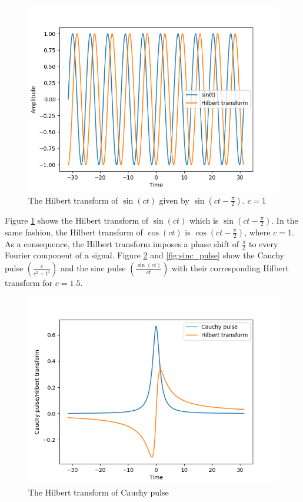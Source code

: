 \documentclass[../Main/thesis.tex]{subfiles}
\begin{document}
\begin{figure}[H]
	\centering
	\includegraphics[width=0.8\linewidth]{../fig/h_sin}
	\caption{The Hilbert transform of $\sin(ct)$ given by $\sin(ct-\frac{\pi}{2})$. $c=1$  }
	\label{fig:hsin}
\end{figure}
\justify
Figure \ref{fig:hsin} shows the Hilbert transform of $\sin(ct)$ which is $\sin\left(ct-\frac{\pi}{2}\right)$. In the same fashion, the Hilbert transform of $\cos(ct)$ is  $\cos\left(ct-\frac{\pi}{2}\right)$, where $c = 1$. As a consequence, the Hilbert transform imposes a phase shift of $\frac{\pi}{2}$ to every Fourier component of a signal. Figure \ref{fig:cauchy_pulse} and \ref{fig:sinc_pulse} show the Cauchy pulse $\left(\frac{c}{c^{2} + t^{2}}\right)$ and the sinc pulse $\left(\frac{\sin(ct)}{ct}\right)$ with their corresponding Hilbert transform for $c = 1.5$.
\begin{figure}[H]
	\centering
	\includegraphics[width=0.8\linewidth]{../fig/cauchy_pulse}
	\caption{The Hilbert transform of Cauchy pulse }
	\label{fig:cauchy_pulse}
\end{figure}
\end{document}
